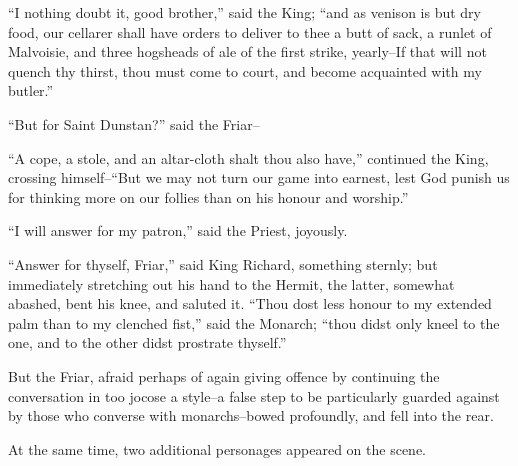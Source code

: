 ``I nothing doubt it, good brother,'' said the King; ``and as venison is
but dry food, our cellarer shall have orders to deliver to thee a butt
of sack, a runlet of Malvoisie, and three hogsheads of ale of the first
strike, yearly--If that will not quench thy thirst, thou must come to
court, and become acquainted with my butler.''

``But for Saint Dunstan?'' said the Friar--

``A cope, a stole, and an altar-cloth shalt thou also have,'' continued
the King, crossing himself--``But we may not turn our game into earnest,
lest God punish us for thinking more on our follies than on his honour
and worship.''

``I will answer for my patron,'' said the Priest, joyously.

``Answer for thyself, Friar,'' said King Richard, something sternly; but
immediately stretching out his hand to the Hermit, the latter, somewhat
abashed, bent his knee, and saluted it. ``Thou dost less honour to my
extended palm than to my clenched fist,'' said the Monarch; ``thou didst
only kneel to the one, and to the other didst prostrate thyself.''

But the Friar, afraid perhaps of again giving offence by continuing the
conversation in too jocose a style--a false step to be particularly
guarded against by those who converse with monarchs--bowed profoundly,
and fell into the rear.

At the same time, two additional personages appeared on the scene.
